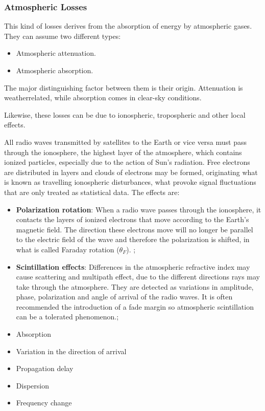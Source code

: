 \subsubsection{Atmospheric Losses}
This kind of losses derives from the absorption of energy by atmospheric gases. They can assume two different types:

\begin{itemize}
	\item Atmospheric attenuation.
	\item Atmospheric absorption.
\end{itemize}

The major distinguishing factor between them is their origin. Attenuation is weatherrelated, while absorption comes in clear-sky conditions.

Likewise, these losses can be due to ionospheric, tropospheric and other local effects. \cite{Jorge2012}

All radio waves transmitted by satellites to the Earth or vice versa must pass through the ionosphere, the highest layer of the atmosphere, which contains ionized particles, especially due to the action of Sun's radiation. Free electrons are distributed in layers and clouds of electrons may be formed, originating what is known as travelling ionospheric disturbances, what provoke signal fluctuations that are only treated as statistical data. The effects are:

\begin{itemize}
	\item \textbf{Polarization rotation}: When a radio wave passes through the ionosphere, it contacts the layers of ionized 	electrons that move according to the Earth’s magnetic field. The direction these 	electrons move will no longer be parallel to the electric field of the wave and therefore	the polarization is shifted, in what is called Faraday rotation ($\theta_F$). ;
	\item \textbf{Scintillation effects}: Differences in the atmospheric refractive index may cause scattering and multipath 	effect, due to the different directions rays may take through the atmosphere. They are detected as variations in amplitude, phase, polarization and angle of arrival of	the radio waves.	It is often recommended the introduction of a fade margin so atmospheric scintillation
	can be a tolerated phenomenon.; 
	\item Absorption
	\item Variation in the direction of arrival
	\item Propagation delay
	\item Dispersion
	\item Frequency change
\end{itemize}

